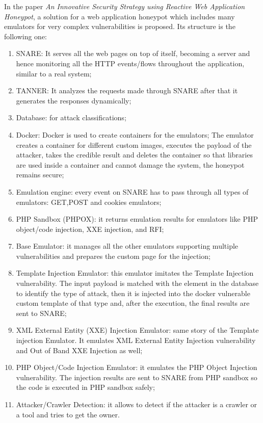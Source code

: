 In the paper \textit{An Innovative Security Strategy using Reactive Web Application Honeypot}\cite{https://doi.org/10.48550/arxiv.2105.04773}, a solution for a web application honeypot which includes many emulators for very complex vulnerabilities is proposed. Its structure is the following one:
\begin{enumerate}
    \item SNARE: It serves all the web pages on top of itself, becoming a server and hence monitoring all the HTTP events/flows throughout the application, similar to a real system;
    \item TANNER: It analyzes the requests made through SNARE after that it generates the responses dynamically;
    \item Database: for attack classifications;
    \item Docker: Docker is used to create containers for the emulators;
    The emulator creates a container for different custom images, executes the payload of the attacker, takes the credible result and deletes the container so that libraries are used inside a container and cannot damage the system, the honeypot remains secure;
    \item Emulation engine: every event on SNARE has to pass through all types of emulators: GET,POST and cookies emulators;
    \item PHP Sandbox (PHPOX): it returns emulation results for emulators like PHP object/code injection, XXE injection, and RFI;
    \item Base Emulator: it manages all the other emulators supporting multiple vulnerabilities and prepares the custom page for the injection;
    \item Template Injection Emulator: this emulator imitates the Template Injection vulnerability. The input payload is matched with the element in the database to identify the type of attack, then it is injected into the docker vulnerable custom template of that type and, after the execution, the final results are sent to SNARE;
    \item XML External Entity (XXE) Injection Emulator: same story of the Template injection Emulator. It emulates XML External Entity Injection vulnerability and Out of Band XXE Injection as well;
    \item PHP Object/Code Injection Emulator: it emulates the PHP Object Injection vulnerability. The injection results are sent to SNARE from PHP sandbox so the code is executed in PHP sandbox safely;
    \item Attacker/Crawler Detection: it allows to detect if the attacker is a crawler or a tool and tries to get the owner.
\end{enumerate}
